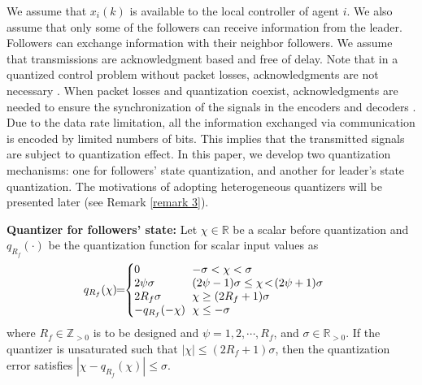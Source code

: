 \documentclass{autart}
\begin{document}
We assume that $x_i(k)$ is available to the local controller of agent $i$. We also assume that only some of the followers can receive information from the leader.
Followers can exchange information with their neighbor followers. We assume that transmissions are acknowledgment based and free of delay. Note that in a quantized control problem without packet losses, acknowledgments are not necessary \cite{1310461,nair2004stabilizability}. When packet losses and quantization coexist, acknowledgments are needed to ensure the synchronization of the signals in the encoders and decoders  \cite{you2010minimum, wakaiki2019stabilization}. Due to the data rate limitation, all the information exchanged via communication is encoded by limited numbers of bits. This implies that the transmitted signals are subject to quantization effect. In this paper, we develop two quantization mechanisms: one for followers' state quantization, and another for leader's state quantization.
The motivations of adopting heterogeneous quantizers will be presented later (see Remark \ref{remark 3}).   

\textbf{Quantizer for followers' state:}  Let $\chi \in \mathbb{R}$ be a scalar before quantization and $q_{R_f}(\cdot)$ be the quantization function for scalar
input values as
\begin{align}\setlength{\arraycolsep}{3pt}  \label{quantizer}
\!\!q_{R_f} (\chi)\!\! = \!\! 
\left\{\!\!
\begin{array}{lll}
0 & -\sigma < \chi < \sigma & \\
2\psi \sigma & (2\psi-1)\sigma \le \chi \! < \!(2\psi+1)\sigma  \\
2R_f\sigma & \chi \ge  (2R_f+1) \sigma&         \\
-q_{R_f} (-\chi) & \chi \le - \sigma & 
\end{array}
\right.
\end{align}
where $R_f\in \mathbb{Z}_{>0}$ is to be designed and $\psi =1, 2, \cdots, R_f$, and $\sigma \in \mathbb{R}_{>0}$. If the quantizer is unsaturated such that $|\chi| \le (2R_f+1)\sigma $, then the  quantization error satisfies 
$
|\chi - q_{R_f}(\chi)| \le \sigma.
$
\end{document}
